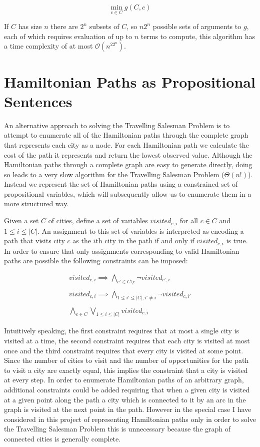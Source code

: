 \documentclass[12pt,a4paper,twoside,openright]{report}
\begin{document}
$$
\min_{c\in C} g(C,c)
$$

If $C$ has size $n$ there are $2^n$ subsets of $C$, so $n2^n$ possible sets of arguments to $g$, each of which requires evaluation of up to $n$ terms to compute, this algorithm has a time complexity of at most $\mathcal{O}(n^22^n)$.

\section{Hamiltonian Paths as Propositional Sentences} \label{hamiltonianpath}
An alternative approach to solving the Travelling Salesman Problem is to attempt to enumerate all of the Hamiltonian paths through the complete graph that represents each city as a node. For each Hamiltonian path we calculate the cost of the path it represents and return the lowest observed value. Although the Hamiltonian paths through a complete graph are easy to generate directly, doing so leads to a very slow algorithm for the Travelling Salesman Problem ($\Theta(n!)$). Instead we represent the set of Hamiltonian paths using a constrained set of propositional variables, which will subsequently allow us to enumerate them in a more structured way.

Given a set $C$ of cities, define a set of variables $visited_{c,i}$ for all $c\in C$ and $1\leq i\leq|C|$. An assignment to this set of variables is interpreted as encoding a path that visits city $c$ as the $i$th city in the path if and only if $visited_{c,i}$ is true. In order to ensure that only assignments corresponding to valid Hamiltonian paths are possible the following constraints can be imposed:

\begin{gather*}
visited_{c,i}\implies\bigwedge_{c'\in C\setminus c}\neg visited_{c',i} \\ \\
visited_{c,i}\implies\bigwedge_{1\leq i'\leq |C|,i'\neq i}\neg visited_{c,i'} \\ \\
\bigwedge_{c\in C}\bigvee_{1\leq i\leq |C|} visited_{c,i}
\end{gather*}

Intuitively speaking, the first constraint requires that at most a single city is visited at a time, the second constraint requires that each city is visited at most once and the third constraint requires that every city is visited at some point. Since the number of cities to visit and the number of opportunities for the path to visit a city are exactly equal, this implies the constraint that a city is visited at every step. In order to enumerate Hamiltonian paths of an arbitrary graph, additional constraints could be added requiring that when a given city is visited at a given point along the path a city which is connected to it by an arc in the graph is visited at the next point in the path. However in the special case I have considered in this project of representing Hamiltonian paths only in order to solve the Travelling Salesman Problem this is unnecessary because the graph of connected cities is generally complete.
\end{document}
